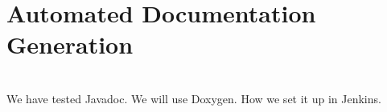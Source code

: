 

\section{Automated Documentation Generation}\label{sec:automated_documentation_gen}
\\
We have tested Javadoc. We will use Doxygen. How we set it up in Jenkins.

